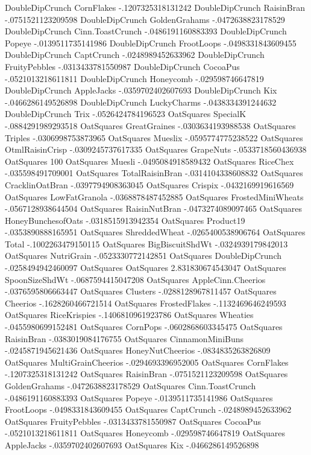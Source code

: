 DoubleDipCrunch	CornFlakes	-.1207325318131242
DoubleDipCrunch	RaisinBran	-.0751521123209598
DoubleDipCrunch	GoldenGrahams	-.0472638823178529
DoubleDipCrunch	Cinn.ToastCrunch	-.0486191160883393
DoubleDipCrunch	Popeye	-.0139511735141986
DoubleDipCrunch	FrootLoops	-.0498331843609455
DoubleDipCrunch	CaptCrunch	-.0248989452633962
DoubleDipCrunch	FruityPebbles	-.0313433781550987
DoubleDipCrunch	CocoaPus	-.0521013218611811
DoubleDipCrunch	Honeycomb	-.029598746647819
DoubleDipCrunch	AppleJacks	-.0359702402607693
DoubleDipCrunch	Kix	-.0466286149526898
DoubleDipCrunch	LuckyCharms	-.0438334391244632
DoubleDipCrunch	Trix	-.0526424784196523
OatSquares	SpecialK	-.0884291989293518
OatSquares	GreatGraines	-.0303634193988538
OatSquares	Triples	-.0306998753873965
OatSquares	Mueslix	-.0595774775238522
OatSquares	OtmlRaisinCrisp	-.0309245737617335
OatSquares	GrapeNuts	-.0533718560436938
OatSquares	100%
OatSquares	Muesli	-.0495084918589432
OatSquares	RiceChex	-.035598491709001
OatSquares	TotalRaisinBran	-.0314104338608832
OatSquares	CracklinOatBran	-.0397794908363045
OatSquares	Crispix	-.0432169919616569
OatSquares	LowFatGranola	-.0368878487452885
OatSquares	FrostedMiniWheats	-.0567128938644504
OatSquares	RaisinNutBran	-.0473274089097465
OatSquares	HoneyBunchesofOats	-.0318515913942354
OatSquares	Product19	-.0353890888165951
OatSquares	ShreddedWheat	-.0265400538906764
OatSquares	Total	-.1002263479150115
OatSquares	BigBiscuitShdWt	-.0324939179842013
OatSquares	NutriGrain	-.0523330772142851
OatSquares	DoubleDipCrunch	-.0258494942460097
OatSquares	OatSquares	2.831830674543047
OatSquares	SpoonSizeShdWt	-.0687594415047208
OatSquares	AppleCinn.Cheerios	-.0376595806663447
OatSquares	Clusters	-.0288128967811457
OatSquares	Cheerios	-.1628260466721514
OatSquares	FrostedFlakes	-.1132469646249593
OatSquares	RiceKrispies	-.1406810961923786
OatSquares	Wheaties	-.0455980699152481
OatSquares	CornPops	-.0602868603345475
OatSquares	RaisinBran	-.0383019084176755
OatSquares	CinnamonMiniBuns	-.0245871945621436
OatSquares	HoneyNutCheerios	-.0834835263826809
OatSquares	MultiGrainCheerios	-.0294693396952005
OatSquares	CornFlakes	-.1207325318131242
OatSquares	RaisinBran	-.0751521123209598
OatSquares	GoldenGrahams	-.0472638823178529
OatSquares	Cinn.ToastCrunch	-.0486191160883393
OatSquares	Popeye	-.0139511735141986
OatSquares	FrootLoops	-.0498331843609455
OatSquares	CaptCrunch	-.0248989452633962
OatSquares	FruityPebbles	-.0313433781550987
OatSquares	CocoaPus	-.0521013218611811
OatSquares	Honeycomb	-.029598746647819
OatSquares	AppleJacks	-.0359702402607693
OatSquares	Kix	-.0466286149526898
